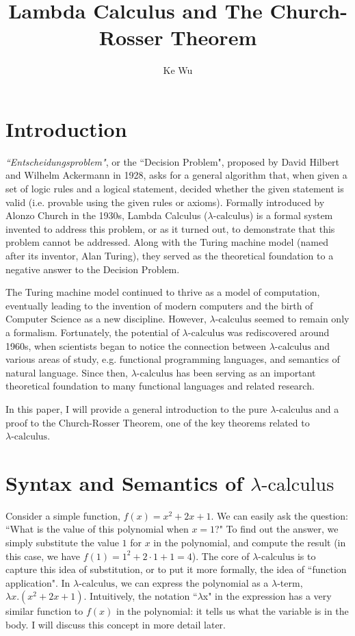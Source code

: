 \documentclass[a4paper,11pt]{article}
\title{Lambda Calculus and The Church-Rosser Theorem}
\author{Ke Wu}
\theoremstyle{definition}
\theoremstyle{example}
\theoremstyle{lemma}
\newcommand{\lcalc}{\lambda\text{-calculus}}
\newcommand{\lamterm}[2]{\lambda #1. #2}
\begin{document}
\maketitle

\tableofcontents

\newpage

\section{Introduction}

\textit{``Entscheidungsproblem"}, or the ``Decision Problem", proposed by David Hilbert and Wilhelm Ackermann in 1928, asks for a general algorithm that, when given a set of logic rules and a logical statement, decided whether the given statement is valid (i.e. provable using the given rules or axioms). Formally introduced by Alonzo Church in the 1930s, Lambda Calculus ($\lcalc$) is a formal system invented to address this problem, or as it turned out, to demonstrate that this problem cannot be addressed. Along with the Turing machine model (named after its inventor, Alan Turing), they served as the theoretical foundation to a negative answer to the Decision Problem\cite{Barendregt2000}.

The Turing machine model continued to thrive as a model of computation, eventually leading to the invention of modern computers and the birth of Computer Science as a new discipline. However, $\lcalc$ seemed to remain only a formalism. Fortunately, the potential of $\lcalc$ was rediscovered around 1960s, when scientists began to notice the connection between $\lcalc$ and various areas of study, e.g. functional programming languages, and semantics of natural language. Since then, $\lcalc$ has been serving as an important theoretical foundation to many functional languages and related research\cite{sep-lambda-calculus}.

In this paper, I will provide a general introduction to the pure $\lcalc$ and a proof to the Church-Rosser Theorem, one of the key theorems related to $\lcalc$.

\section{Syntax and Semantics of $\lcalc$}

Consider a simple function, $f(x) = x^2 + 2x + 1$. We can easily ask the question: ``What is the value of this polynomial when $x = 1$?" To find out the answer, we simply substitute the value $1$ for $x$ in the polynomial, and compute the result (in this case, we have $f(1) = 1^2 + 2\cdot 1 + 1 = 4$). The core of $\lcalc$ is to capture this idea of substitution, or to put it more formally, the idea of ``function application". In $\lcalc$, we can express the polynomial as a $\lambda$-term, $\lamterm{x}{(x^2 + 2x + 1)}$. Intuitively, the notation ``$\lambda$x" in the expression has a very similar function to $f(x)$ in the polynomial: it tells us what the variable is in the body. I will discuss this concept in more detail later. 
\end{document}

